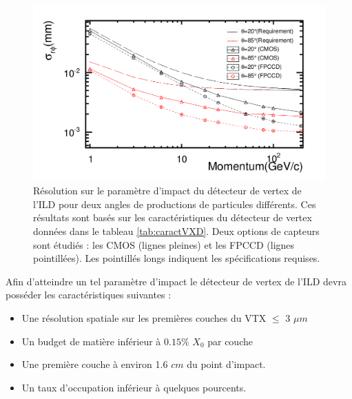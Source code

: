   \begin{figure}[!htb]
    \begin{center} 
      \includegraphics[scale=0.40]{./figures/sigmaIP_vs_p.png}
      \caption{R\'esolution sur le param\`etre d'impact du d\'etecteur de vertex de l'ILD pour deux angles de productions de particules diff\'erents. Ces r\'esultats sont bas\'es sur les caract\'eristiques du détecteur de vertex donn\'ees dans le tableau \ref{tab:caractVXD}. Deux options de capteurs sont \'etudi\'es : les CMOS (lignes pleines) et les FPCCD (lignes pointill\'ees). Les pointill\'es longs indiquent les spécifications requises.}
      \label{fig:sigmaIP}
    \end{center}
  \end{figure}
  
  \medskip
  
  Afin d'atteindre un tel param\`etre d'impact le d\'etecteur de vertex de l'ILD devra poss\'eder les caract\'eristiques suivantes : 

  \medskip
  
  \renewcommand{\labelitemi}{$\bullet$}
  \begin{itemize}
   \item Une r\'esolution spatiale sur les premi\`eres couches du VTX $\leq$ 3 $\mu m$
   \item Un budget de mati\`ere inf\'erieur \`a $0.15 \%$ $X_0$ par couche
   \item Une premi\`ere couche \`a environ 1.6 $cm$ du point d'impact.
   \item Un taux d'occupation inf\'erieur \`a quelques pourcents.
   \label{list:caracteristiques}
   \end{itemize}
  
  \medskip  


